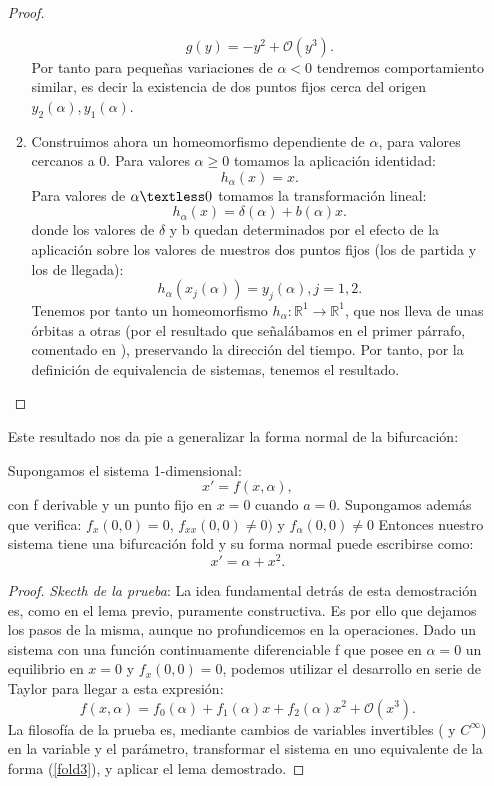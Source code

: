 \begin{enumerate}
\begin{proof}
\begin{enumerate}
		\[ g(y) = -y^2 + \mathcal{O}(y^3) .\]
		Por tanto para pequeñas variaciones de $\alpha < 0$ tendremos comportamiento similar, es decir la existencia de dos puntos fijos cerca del origen  $y_2(\alpha), y_1(\alpha)$.
		\item Construimos ahora un homeomorfismo dependiente de $\alpha$, para valores cercanos a 0. Para valores  $\alpha \geq 0$ tomamos la aplicación identidad:
		\[ h_\alpha (x) = x .\]
		Para valores de $\alpha \textless 0$ tomamos la transformación lineal:
		\[ h_\alpha (x) = \delta (\alpha) + b(\alpha)x. \]
		donde los valores de $\delta$ y b quedan determinados por el efecto de la aplicación sobre los valores de nuestros dos puntos fijos (los de partida y los de llegada):
		\[ h_\alpha (x_j (\alpha)) = y_j(\alpha), j = 1, 2 .\]
		Tenemos por tanto un homeomorfismo $h_\alpha:\mathbb{R}^1 \to \mathbb{R}^1$, que nos lleva de unas órbitas a otras (por el resultado que señalábamos en el primer párrafo, comentado en \cite{Kuznet}), preservando la dirección del tiempo. Por tanto, por la definición de equivalencia de sistemas, tenemos el resultado.
	\end{enumerate}
\end{proof}
Este resultado nos da pie a generalizar la forma normal de la bifurcación: 
\begin{theorem}
	Supongamos el sistema 1-dimensional:
	\begin{equation}
	x'=f(x,\alpha),
	\end{equation}
	con f derivable y un punto fijo en $x=0$ cuando $a=0$. Supongamos además que verifica: $f_x(0,0)=0$, $f_{xx}(0,0) \neq 0)$ y $f_\alpha(0,0) \neq 0$ Entonces nuestro sistema tiene una bifurcación fold y su forma normal puede escribirse como: \[x'=\alpha+x^2.\]
\end{theorem}
\begin{proof}
	\textit{Skecth de la prueba}\cite{prac,Kuznet}: La idea fundamental detrás de esta demostración es, como en el lema previo, puramente constructiva. Es por ello que dejamos los pasos de la misma, aunque no profundicemos en la operaciones. 
	Dado un sistema con una función continuamente diferenciable f que posee en $\alpha=0$ un equilibrio en $x=0$ y $f_x(0,0)=0$, podemos utilizar el desarrollo en serie de Taylor para llegar a esta expresión:
	\[f(x,\alpha)=f_0(\alpha)+f_1(\alpha)x+f_2(\alpha)x^2+\mathcal{O}(x^3).  \]
	La filosofía de la prueba es, mediante cambios de variables invertibles ( y $C^\infty$) en la variable y el parámetro, transformar el sistema en uno equivalente de la forma (\ref{fold3}), y aplicar el lema demostrado.
	

\end{proof}
\end{enumerate}
